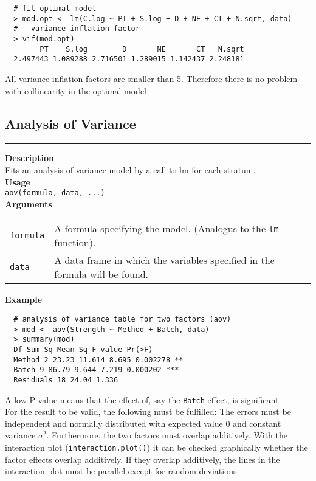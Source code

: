 \begingroup
  \scriptsize
  \begin{verbatim}
  # fit optimal model
  > mod.opt <- lm(C.log ~ PT + S.log + D + NE + CT + N.sqrt, data)
  #   variance inflation factor
  > vif(mod.opt)
        PT    S.log        D       NE       CT   N.sqrt
  2.497443 1.089288 2.716501 1.289015 1.142437 2.248181
  \end{verbatim}
\endgroup
All variance inflation factors are smaller than 5. Therefore there is no problem with collinearity in the optimal model\\

\subsection{Analysis of Variance}
\noindent\rule[\linienAbstand]{\linewidth}{\linienDicke}
\textbf{Description}\\
Fits an analysis of variance model by a call to lm for each stratum.\\

\textbf{Usage}\\
\texttt{aov(formula, data, ...)}\\

\textbf{Arguments}\vspace{-0.5cm}
\begin{table}[H]
  \scriptsize
  \begin{tabularx}{\linewidth}{lX}
    \texttt{formula} & A formula specifying the model. (Analogus to the \texttt{lm} function).\\
    \texttt{data} & A data frame in which the variables specified in the formula will be found.
  \end{tabularx}
\end{table}

\textbf{Example}\\
\begingroup
\scriptsize
\begin{verbatim}
  # analysis of variance table for two factors (aov)
  > mod <- aov(Strength ~ Method + Batch, data)
  > summary(mod)
  Df Sum Sq Mean Sq F value Pr(>F)
  Method 2 23.23 11.614 8.695 0.002278 **
  Batch 9 86.79 9.644 7.219 0.000202 ***
  Residuals 18 24.04 1.336

\end{verbatim}
\endgroup
A low P-value means that the effect of, say the \texttt{Batch}-effect, is significant.\\
For the result to be valid, the following must be fulfilled: The errors must be independent and normally distributed with expected value $0$ and constant variance $\sigma^2$. Furthermore, the two factors must overlap additively. With the interaction plot (\texttt{interaction.plot()}) it can be checked graphically whether the factor effects overlap additively. If they overlap additively, the lines in the interaction plot must be parallel except for random deviations.


